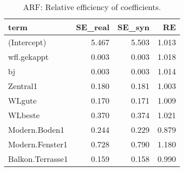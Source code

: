 \begin{table}[ht]
\centering
\begin{tabular}{lrrr}
  \hline
term & SE\_real & SE\_syn & RE \\ 
  \hline
(Intercept) & 5.467 & 5.503 & 1.013 \\ 
  wfl.gekappt & 0.003 & 0.003 & 1.018 \\ 
  bj & 0.003 & 0.003 & 1.014 \\ 
  Zentral1 & 0.180 & 0.181 & 1.003 \\ 
  WLgute & 0.170 & 0.171 & 1.009 \\ 
  WLbeste & 0.370 & 0.374 & 1.021 \\ 
  Modern.Boden1 & 0.244 & 0.229 & 0.879 \\ 
  Modern.Fenster1 & 0.728 & 0.790 & 1.180 \\ 
  Balkon.Terrasse1 & 0.159 & 0.158 & 0.990 \\ 
   \hline
\end{tabular}
\caption{ARF: Relative efficiency of coefficients.} 
\label{tab:arf:re}
\end{table}
